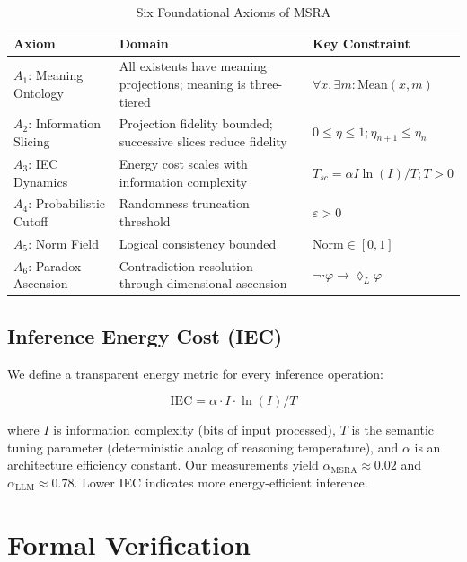\documentclass[11pt,a4paper]{article}
\begin{document}
\begin{table}[h]
\centering
\caption{Six Foundational Axioms of MSRA}
\label{tab:axioms}
\begin{tabular}{@{}p{3cm}p{5cm}p{5cm}@{}}
\toprule
\textbf{Axiom} & \textbf{Domain} & \textbf{Key Constraint} \\
\midrule
$A_1$: Meaning Ontology & All existents have meaning projections; meaning is three-tiered & $\forall x, \exists m: \text{Mean}(x,m)$ \\
$A_2$: Information Slicing & Projection fidelity bounded; successive slices reduce fidelity & $0\leq\eta\leq1; \eta_{n+1}\leq\eta_n$ \\
$A_3$: IEC Dynamics & Energy cost scales with information complexity & $T_{sc}=\alpha I\ln(I)/T; T>0$ \\
$A_4$: Probabilistic Cutoff & Randomness truncation threshold & $\varepsilon>0$ \\
$A_5$: Norm Field & Logical consistency bounded & $\text{Norm}\in[0,1]$ \\
$A_6$: Paradox Ascension & Contradiction resolution through dimensional ascension & $\neg\square\varphi\rightarrow\lozenge_L\varphi$ \\
\bottomrule
\end{tabular}
\end{table}

\subsection{Inference Energy Cost (IEC)}

We define a transparent energy metric for every inference operation:

\begin{equation}
\text{IEC} = \alpha \cdot I \cdot \ln(I) / T
\label{eq:iec}
\end{equation}

where $I$ is information complexity (bits of input processed), $T$ is the semantic tuning parameter (deterministic analog of reasoning temperature), and $\alpha$ is an architecture efficiency constant. Our measurements yield $\alpha_{\text{MSRA}} \approx 0.02$ and $\alpha_{\text{LLM}} \approx 0.78$. Lower IEC indicates more energy-efficient inference.

\section{Formal Verification}\label{sec:verification}
\end{document}
